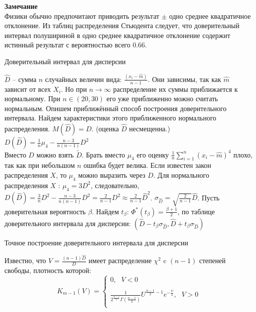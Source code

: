 \documentclass[russian, 12pt, fleqn]{article}
\begin{document}
\textbf{Замечание\ } \\
Физики обычно предпочитают приводить результат $\pm$ одно среднее квадратичное отклонение. Из таблиц распределения Стьюдента следует, что доверительный интервал полушириной в одно среднее  квадратичное отклонение содержит истинный результат с вероятностью всего $0.66$.
\begin{center}
$\textbf{Доверительный интервал для дисперсии }$
\end{center}
$\hat{D}$ -- сумма $n$ случайных величин вида: $\frac{(x_i - \hat{m})}{n - 1}$. Они зависимы, так как $\hat{m}$ зависит от всех $X_i$. Но при  $n \rightarrow \infty$ распределение их суммы приближается к нормальному. При $n \in (20, 30)$ его уже приближенно можно считать нормальным. Опишем 
приближённый способ построения доверительного интервала. Найдем характеристики этого приближенного нормального распределения. $M(\hat{D}) = D$. (оценка $\hat{D}$ несмещенна.)\\ $D(\hat{D}) = \frac{1}{n}\mu_4 - \frac{n-3}{n(n-1)}D^2$\\
Вместо $D$ можно взять $\tilde{D}$. Брать вместо $\mu_4$ его оценку $\frac{1}{n}\displaystyle{\sum \limits _{i=1} ^ {n} } (x_i - \hat{m})^4$ плохо, так как при небольшом $n$ ошибка будет велика. Если известен закон распределения $X$, то $\mu_4$ можно выразить через $D$. Для нормального распределения $X$ : $\mu_4 = 3D^2$, следовательно, $D(\hat{D}) = \frac{3}{n} D^2 - \frac{n - 3}{n(n-1)}D^2 = \frac{2}{n - 1}D^2 \approx \frac{2}{n - 1} \hat{D}^2 $. $\sigma_{\hat{D}} = \sqrt{\frac{2}{n - 1}} \hat{D}$. Пусть доверительная вероятность $\beta$. Найдем $t_{\beta}$: $\Phi^*(t_{\beta}) = \frac{\beta + 1}{2}$, по таблице доверительного интервала для дисперсии: $(\hat{D} - t_\beta \sigma_{\hat{D}}, \hat{D} + t_\beta \sigma_{\hat{D}})$\\
\begin{center}
$\textbf{Точное построение доверительного интервала для дисперсии}$
\end{center}
Известно, что $V = \frac{(n-1)\hat{D}}{D}$ имеет распределение $\chi^2$ c $(n-1)$ степеней свободы, плотность которой:\\
\noindent
\begin{equation*} 
K_{m - 1}(V)=
 \begin{cases}
   0 ,\ \ \  V < 0\\
	\\
   \frac{1}{  2 ^{ { \frac{n - 1}{2}  }}  \Gamma(\frac{n - 1}{2})} U^{\frac{n - 1}{2} - 1}e^{-\frac{V}{2}}    , \ \ \ V > 0\\
 \end{cases}
\end{equation*}\\
\end{document}
